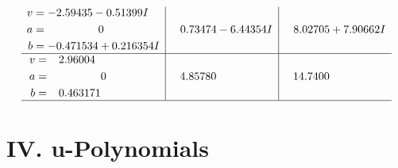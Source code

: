 \documentclass[1p]{elsarticle_modified}
\theoremstyle{definition}
\begin{document}
$$\begin{array}{c|c|c}
\begin{aligned}
v &= -2.59435 - 0.51399 I \\
a &= \phantom{-0.000000 } 0 \\
b &= -0.471534 + 0.216354 I\end{aligned}
 & \phantom{-}0.73474 - 6.44354 I & \phantom{-}8.02705 + 7.90662 I \\ \hline\begin{aligned}
v &= \phantom{-}2.96004\phantom{ +0.000000I} \\
a &= \phantom{-0.000000 } 0 \\
b &= \phantom{-}0.463171\phantom{ +0.000000I}\end{aligned}
 & \phantom{-}4.85780\phantom{ +0.000000I} & \phantom{-}14.7400\phantom{ +0.000000I}\\
 \hline 
 \end{array}$$\newpage
\newpage\renewcommand{\arraystretch}{1}
\centering \section*{ IV. u-Polynomials}
\end{document}
